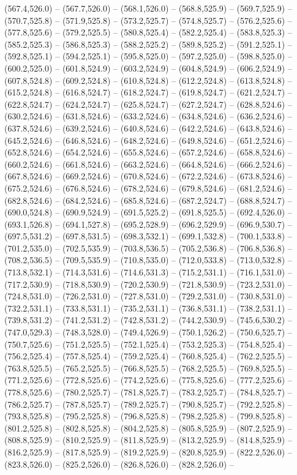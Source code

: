  (567.4,526.0) -- (567.7,526.0) -- (568.1,526.0) -- (568.8,525.9) -- (569.7,525.9) -- (570.7,525.8) -- (571.9,525.8) -- (573.2,525.7) -- (574.8,525.7) -- (576.2,525.6) -- (577.8,525.6) -- (579.2,525.5) -- (580.8,525.4) -- (582.2,525.4) -- (583.8,525.3) -- (585.2,525.3) -- (586.8,525.3) -- (588.2,525.2) -- (589.8,525.2) -- (591.2,525.1) -- (592.8,525.1) -- (594.2,525.1) -- (595.8,525.0) -- (597.2,525.0) -- (598.8,525.0) -- (600.2,525.0) -- (601.8,524.9) -- (603.2,524.9) -- (604.8,524.9) -- (606.2,524.9) -- (607.8,524.8) -- (609.2,524.8) -- (610.8,524.8) -- (612.2,524.8) -- (613.8,524.8) -- (615.2,524.8) -- (616.8,524.7) -- (618.2,524.7) -- (619.8,524.7) -- (621.2,524.7) -- (622.8,524.7) -- (624.2,524.7) -- (625.8,524.7) -- (627.2,524.7) -- (628.8,524.6) -- (630.2,524.6) -- (631.8,524.6) -- (633.2,524.6) -- (634.8,524.6) -- (636.2,524.6) -- (637.8,524.6) -- (639.2,524.6) -- (640.8,524.6) -- (642.2,524.6) -- (643.8,524.6) -- (645.2,524.6) -- (646.8,524.6) -- (648.2,524.6) -- (649.8,524.6) -- (651.2,524.6) -- (652.8,524.6) -- (654.2,524.6) -- (655.8,524.6) -- (657.2,524.6) -- (658.8,524.6) -- (660.2,524.6) -- (661.8,524.6) -- (663.2,524.6) -- (664.8,524.6) -- (666.2,524.6) -- (667.8,524.6) -- (669.2,524.6) -- (670.8,524.6) -- (672.2,524.6) -- (673.8,524.6) -- (675.2,524.6) -- (676.8,524.6) -- (678.2,524.6) -- (679.8,524.6) -- (681.2,524.6) -- (682.8,524.6) -- (684.2,524.6) -- (685.8,524.6) -- (687.2,524.7) -- (688.8,524.7) -- (690.0,524.8) -- (690.9,524.9) -- (691.5,525.2) -- (691.8,525.5) -- (692.4,526.0) -- (693.1,526.8) -- (694.1,527.8) -- (695.2,528.9) -- (696.2,529.9) -- (696.9,530.7) -- (697.5,531.2) -- (697.8,531.5) -- (698.3,532.1) -- (699.1,532.8) -- (700.1,533.8) -- (701.2,535.0) -- (702.5,535.9) -- (703.8,536.5) -- (705.2,536.8) -- (706.8,536.8) -- (708.2,536.5) -- (709.5,535.9) -- (710.8,535.0) -- (712.0,533.8) -- (713.0,532.8) -- (713.8,532.1) -- (714.3,531.6) -- (714.6,531.3) -- (715.2,531.1) -- (716.1,531.0) -- (717.2,530.9) -- (718.8,530.9) -- (720.2,530.9) -- (721.8,530.9) -- (723.2,531.0) -- (724.8,531.0) -- (726.2,531.0) -- (727.8,531.0) -- (729.2,531.0) -- (730.8,531.0) -- (732.2,531.1) -- (733.8,531.1) -- (735.2,531.1) -- (736.8,531.1) -- (738.2,531.1) -- (739.8,531.2) -- (741.2,531.2) -- (742.8,531.2) -- (744.2,530.9) -- (745.6,530.2) -- (747.0,529.3) -- (748.3,528.0) -- (749.4,526.9) -- (750.1,526.2) -- (750.6,525.7) -- (750.7,525.6) -- (751.2,525.5) -- (752.1,525.4) -- (753.2,525.3) -- (754.8,525.4) -- (756.2,525.4) -- (757.8,525.4) -- (759.2,525.4) -- (760.8,525.4) -- (762.2,525.5) -- (763.8,525.5) -- (765.2,525.5) -- (766.8,525.5) -- (768.2,525.5) -- (769.8,525.5) -- (771.2,525.6) -- (772.8,525.6) -- (774.2,525.6) -- (775.8,525.6) -- (777.2,525.6) -- (778.8,525.6) -- (780.2,525.7) -- (781.8,525.7) -- (783.2,525.7) -- (784.8,525.7) -- (786.2,525.7) -- (787.8,525.7) -- (789.2,525.7) -- (790.8,525.7) -- (792.2,525.8) -- (793.8,525.8) -- (795.2,525.8) -- (796.8,525.8) -- (798.2,525.8) -- (799.8,525.8) -- (801.2,525.8) -- (802.8,525.8) -- (804.2,525.8) -- (805.8,525.9) -- (807.2,525.9) -- (808.8,525.9) -- (810.2,525.9) -- (811.8,525.9) -- (813.2,525.9) -- (814.8,525.9) -- (816.2,525.9) -- (817.8,525.9) -- (819.2,525.9) -- (820.8,525.9) -- (822.2,526.0) -- (823.8,526.0) -- (825.2,526.0) -- (826.8,526.0) -- (828.2,526.0) -- 